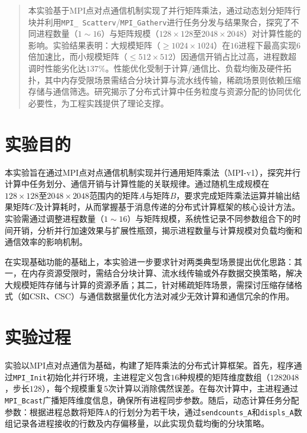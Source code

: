 \documentclass[a4paper, utf8]{ctexart}
\begin{document}
	\maketitle
	
	\renewcommand{\abstractname}{\large \textbf{摘要}}
	\begin{abstract}
		本实验基于MPI点对点通信机制实现了并行矩阵乘法，通过动态划分矩阵行块并利用\verb|MPI_|\ \verb|Scatterv|/\verb|MPI_Gatherv|进行任务分发与结果聚合，探究了不同进程数量（$1\sim16$）与矩阵规模（$128\times128$至$2048\times2048$）对计算性能的影响。实验结果表明：大规模矩阵（$\geq1024\times1024$）在$16$进程下最高实现$6$倍加速比，而小规模矩阵（$\leq512\times512$）因通信开销占比过高，进程数超调时性能劣化达$137\%$。性能优化受制于计算/通信比、负载均衡及硬件拓扑，其中内存受限场景需结合分块计算与流水线传输，稀疏场景则依赖压缩存储与通信筛选。研究揭示了分布式计算中任务粒度与资源分配的协同优化必要性，为工程实践提供了理论支撑。
		
	\end{abstract}
	
	\section{实验目的}
	
	本实验旨在通过MPI点对点通信机制实现并行通用矩阵乘法（MPI-v1），探究并行计算中任务划分、通信开销与计算性能的关联规律。通过随机生成规模在$128 \times 128$至$2048 \times 2048$范围内的矩阵$A$与矩阵$B$，要求完成矩阵乘法运算并输出结果矩阵$C$及计算耗时，从而掌握基于消息传递的分布式计算框架的核心设计方法。实验需通过调整进程数量（$1 \sim 16$）与矩阵规模，系统性记录不同参数组合下的时间开销，分析并行加速效果与扩展性瓶颈，揭示进程数量与计算规模对负载均衡和通信效率的影响机制。
	
	在实现基础功能的基础上，本实验进一步要求针对两类典型场景提出优化思路：其一，在内存资源受限时，需结合分块计算、流水线传输或外存数据交换策略，解决大规模矩阵存储与计算的资源矛盾；其二，针对稀疏矩阵场景，需探讨压缩存储格式（如CSR、CSC）与通信数据量优化方法对减少无效计算和通信冗余的作用。
	
	\section{实验过程}
	
	实验以MPI点对点通信为基础，构建了矩阵乘法的分布式计算框架。首先，程序通过\verb|MPI_Init|初始化并行环境，主进程定义包含$16$种规模的矩阵维度数组（$128$$2048$，步长$128$），每个规模重复$5$次计算以消除偶然误差。在每次计算中，主进程通过\verb|MPI_Bcast|广播矩阵维度信息，确保所有进程同步参数。随后，动态计算任务分配参数：根据进程总数将矩阵A的行划分为若干块，通过\verb|sendcounts_A|和\verb|displs_A|数组记录各进程接收的行数及内存偏移量，以此实现负载均衡的分块策略。
	
\end{document}
